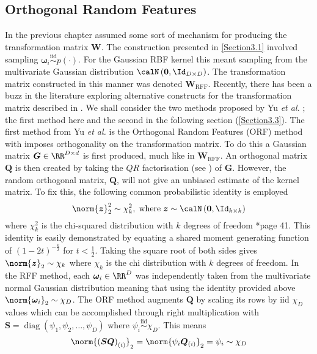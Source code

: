 \subsection{Orthogonal Random Features}\label{Section3.2}
In the previous chapter  assumed some sort of mechanism for producing the transformation matrix $\bm{W}$. The construction presented in \ref{Section3.1} involved sampling $\bm{\omega}_{i} \stackrel{\text{iid}}{\sim} p(\cdot)$. For the Gaussian RBF kernel this meant sampling from the multivariate Gaussian distribution $\calN \left( \bm{0} , \Id_{D \times D} \right)$. The transformation matrix constructed in this manner was denoted $\bm{W}_{\text{RFF}}$. Recently, there has been a buzz in the literature exploring alternative constructs for the transformation matrix described in  \cite{LiuFanghui2021RFfK}. We shall consider the two methods proposed by Yu {\it et al.} \cite{YuFelixX2016ORF}; the first method here and the second in the following section (\ref{Section3.3}). The first method from Yu {\it et al.} is the Orthogonal Random Features (ORF) method with imposes orthogonality on the transformation matrix. To do this a Gaussian matrix $\bm{G} \in \RR^{D \times d}$ is first produced, much like in $\bm{W}_{\text{RFF}}$. An orthogonal matrix $\bm{Q}$ is then created by taking the $QR$ factorisation (see ) of $\bm{G}$. However, the random orthogonal matrix, $\bm{Q}$, will not give an unbiased estimate of the kernel matrix. To fix this, the following common probabilistic identity is employed
\[
    \norm{\bm{z}}^2_2 \sim \chi^2_k, \; \text{where} \; \bm{z} \sim \calN \left( \bm{0}, \Id_{k \times k} \right)
\]
where $\chi^2_k$ is the chi-squared distribution with $k$ degrees of freedom \cite{BrockwellPeterJ1991TSTa}*{page 41}. This identity is easily demonstrated by equating a shared moment generating function of $(1-2t)^{-\frac{k}{2}}$ for $t < \frac{1}{2}$. Taking the square root of both sides gives $\norm{\bm{z}}_2 \sim \chi_k$ where $\chi_k$ is the chi distribution with $k$ degrees of freedom. In the RFF method, each $\bm{\omega}_i \in \RR^D$ was independently taken from the multivariate normal Gaussian distribution meaning that using the identity provided above $\norm{\bm{\omega}_i}_2 \sim \chi_D$. The ORF method augments $\bm{Q}$ by scaling its rows by iid $\chi_D$ values which can be accomplished through right multiplication with $\bm{S} = \operatorname{diag} \left( \psi_1 , \psi_2 , \ldots , \psi_D \right)$ where $\psi_i \stackrel{\text{iid}}{\sim} \chi_D$. This means
\[
    \norm{\left(\bm{S} \bm{Q}\right)_{(i)}}_2 = \norm{\psi_i \bm{Q}_{(i)}}_2 = \psi_i \sim \chi_D
\]
